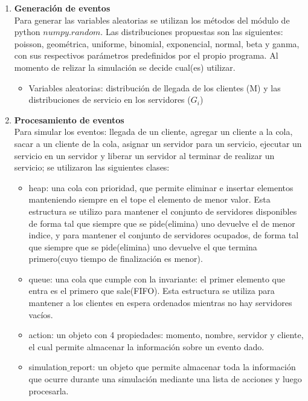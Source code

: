 \documentclass[article]{amsart}
\begin{document}
\begin{enumerate}
\item \textbf{Generaci\'on de eventos}\\
Para generar las variables aleatorias se utilizan los m\'etodos del m\'odulo de python $numpy.random$. Las distribuciones propuestas son las siguientes: poisson, geom\'etrica, uniforme, binomial, exponencial, normal, beta y ganma, con sus respectivos par\'ametros predefinidos por el propio programa. Al momento de relizar la simulaci\'on se decide cual(es) utilizar.\\
\begin{itemize}
\item Variables aleatorias: distribución de llegada de los clientes (M) y las distribuciones de servicio en los servidores ($G_{i}$)\\
\end{itemize}
\item \textbf{Procesamiento de eventos}\\
Para simular los eventos: llegada de un cliente, agregar un cliente a la cola, sacar a un cliente de la cola, asignar un servidor para un servicio, ejecutar un servicio en un servidor y liberar un servidor al terminar de realizar un servicio; se utilizaron las siguientes clases: \\
\begin{itemize}
\item heap: una cola con prioridad, que permite eliminar e insertar elementos manteniendo siempre en el tope el elemento de menor valor. Esta estructura se utilizo para mantener el conjunto de servidores disponibles de forma tal que siempre que se pide(elimina) uno devuelve el de menor indice, y para mantener el conjunto de servidores ocupados, de forma tal que siempre que se pide(elimina) uno devuelve el que termina primero(cuyo tiempo de finalizaci\'on es menor). \\
\item queue: una cola que cumple con la invariante: el primer elemento que entra es el primero que sale(FIFO). Esta estructura se utiliza para mantener a los clientes en espera ordenados mientras no hay servidores vac\'ios.\\
\item action: un objeto con 4 propiedades: momento, nombre, servidor y cliente, el cual permite almacenar la informaci\'on sobre un evento dado.\\
\item simulation$\_$report: un objeto que permite almacenar toda la informaci\'on que ocurre durante una simulaci\'on mediante una lista de acciones y luego procesarla.\\

\end{itemize}
\end{enumerate}
\end{document}
